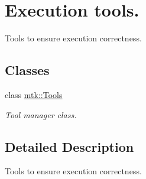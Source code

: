 \hypertarget{group__c03-execution__tools}{\section{Execution tools.}
\label{group__c03-execution__tools}
}


Tools to ensure execution correctness.  


\subsection*{Classes}
\begin{DoxyCompactItemize}
\item 
class \hyperlink{classmtk_1_1Tools}{mtk\-::\-Tools}
\begin{DoxyCompactList}\small\item\em Tool manager class. \end{DoxyCompactList}\end{DoxyCompactItemize}


\subsection{Detailed Description}
Tools to ensure execution correctness. 